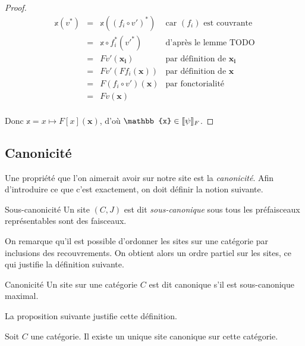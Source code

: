 \begin{proof}
    \[\begin{array}{rcll}
        \mathbb{x}(v^*) & = & \mathbb{x}((f_i\circ v')^*)
                                & \text{car $(f_i)$ est couvrante} \\
                        & = & \mathbb{x}\circ f_i^*(v'^*)
                                & \text{d'après le lemme TODO} \\
                        & = & Fv'(\mathbf{x_i})
                                & \text{par définition de }\mathbf{x_i}\\
                        & = & Fv'(Ff_i(\mathbf{x}))
                                & \text{par définition de }\mathbf{x} \\
                        & = & F(f_i\circ v')(\mathbf{x})
                                & \text{par fonctorialité} \\
                        & = & Fv(\mathbf{x}) & \\
    \end{array}\]

    Donc $\mathbb{x} = x\mapsto F[x](\mathbf{x})$, d'où $\mathbb{x}\in\sem{\psi}_F$.
\end{proof}

\subsection{Canonicité}

Une propriété que l'on aimerait avoir sur notre site est la \emph{canonicité}. Afin
d'introduire ce que c'est exactement, on doit définir la notion suivante.

\begin{defi}{Sous-canonicité}
    Un site $(C,J)$ est dit \emph{sous-canonique} sous tous les préfaisceaux
    représentables sont des faisceaux.
\end{defi}

On remarque qu'il est possible d'ordonner les sites sur une catégorie par inclusions
des recouvrements. On obtient alors un ordre partiel sur les sites, ce qui justifie
la définition suivante.

\begin{defi}{Canonicité}
    Un site sur une catégorie $C$ est dit canonique s'il est sous-canonique maximal.
\end{defi}

La proposition suivante justifie cette définition.

\begin{prop}
    Soit $C$ une catégorie. Il existe un unique site canonique sur cette catégorie.
\end{prop}

